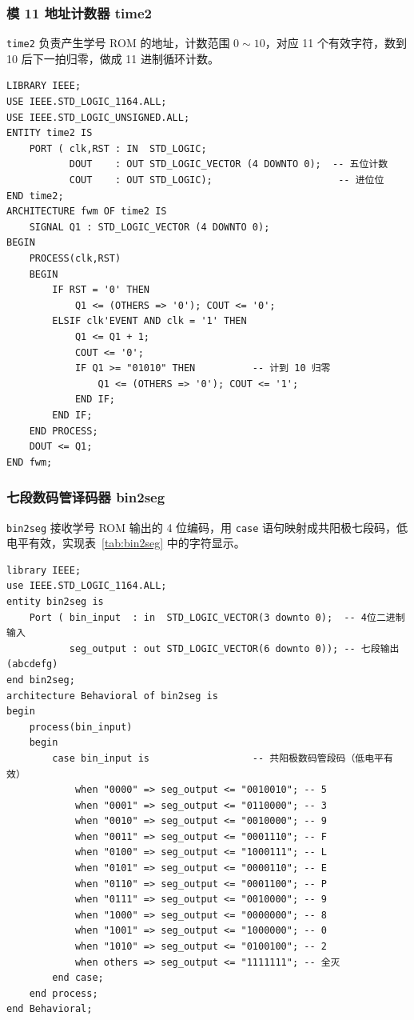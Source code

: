 \documentclass[12pt]{ctexart}
\begin{document}
\subsubsection{模 11 地址计数器 time2}

\texttt{time2} 负责产生学号 ROM 的地址，计数范围 $0\sim10$，对应 11 个有效字符，数到 10 后下一拍归零，做成 11 进制循环计数。

\begin{verbatim}
LIBRARY IEEE;
USE IEEE.STD_LOGIC_1164.ALL;
USE IEEE.STD_LOGIC_UNSIGNED.ALL;
ENTITY time2 IS
    PORT ( clk,RST : IN  STD_LOGIC;
           DOUT    : OUT STD_LOGIC_VECTOR (4 DOWNTO 0);  -- 五位计数
           COUT    : OUT STD_LOGIC);                      -- 进位位
END time2;
ARCHITECTURE fwm OF time2 IS
    SIGNAL Q1 : STD_LOGIC_VECTOR (4 DOWNTO 0);
BEGIN
    PROCESS(clk,RST)
    BEGIN
        IF RST = '0' THEN
            Q1 <= (OTHERS => '0'); COUT <= '0';
        ELSIF clk'EVENT AND clk = '1' THEN
            Q1 <= Q1 + 1;
            COUT <= '0';
            IF Q1 >= "01010" THEN          -- 计到 10 归零
                Q1 <= (OTHERS => '0'); COUT <= '1';
            END IF;
        END IF;
    END PROCESS;
    DOUT <= Q1;
END fwm;
\end{verbatim}
\label{lst:time2}

\subsubsection{七段数码管译码器 bin2seg}

\texttt{bin2seg} 接收学号 ROM 输出的 4 位编码，用 \texttt{case} 语句映射成共阳极七段码，低电平有效，实现表~\ref{tab:bin2seg} 中的字符显示。

\begin{verbatim}
library IEEE;
use IEEE.STD_LOGIC_1164.ALL;
entity bin2seg is
    Port ( bin_input  : in  STD_LOGIC_VECTOR(3 downto 0);  -- 4位二进制输入
           seg_output : out STD_LOGIC_VECTOR(6 downto 0)); -- 七段输出(abcdefg)
end bin2seg;
architecture Behavioral of bin2seg is
begin
    process(bin_input)
    begin
        case bin_input is                  -- 共阳极数码管段码（低电平有效）
            when "0000" => seg_output <= "0010010"; -- 5
            when "0001" => seg_output <= "0110000"; -- 3
            when "0010" => seg_output <= "0010000"; -- 9
            when "0011" => seg_output <= "0001110"; -- F
            when "0100" => seg_output <= "1000111"; -- L
            when "0101" => seg_output <= "0000110"; -- E
            when "0110" => seg_output <= "0001100"; -- P
            when "0111" => seg_output <= "0010000"; -- 9
            when "1000" => seg_output <= "0000000"; -- 8
            when "1001" => seg_output <= "1000000"; -- 0
            when "1010" => seg_output <= "0100100"; -- 2
            when others => seg_output <= "1111111"; -- 全灭
        end case;
    end process;
end Behavioral;
\end{verbatim}
\label{lst:bin2seg}
\end{document}
